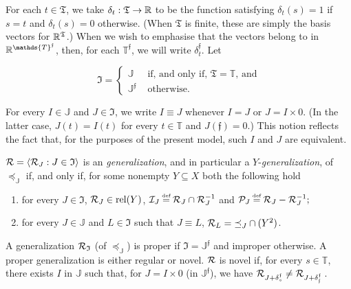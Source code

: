 \documentclass[12pt,a4paper,twoside]{article}
\newcommand{\relations}{\operatorname{rel}}
\newcommand{\novel}{\mathfrak f}
\newcommand{\preceqb}{\mathbin{\preceq}}
\newcommand{\ext}{\mathrel{\mc R}}
\newcommand{\extb}{\mathbin{\mc R}}
\newcommand{\sextb}{\mathbin{\mc P}}
\newcommand{\nextb}{\mathbin{\mc I}}
\newcommand{\mbbt}{{\mathds {T}}}
\newcommand{\mbbtp}{{\mathds{T} ^ \novel }}
\newcommand{\mbbtpp}{{\mathfrak{T}}}
\newcommand{\mbbj}{\mathds J}
\newcommand{\mbbjp}{{\mathds {J}^{\novel}}}
\newcommand{\mbbjpp}{\mathfrak I}
\begin{document}
\begin{appendices}
For each $t \in \mbbtpp$, we take  $\delta_{t} : \mbbtpp \rightarrow \R$ to be
the function satisfying $\delta_{t} ( s ) = 1$ if $s = t$ and $\delta_{t} ( s ) = 0$
otherwise. (When $\mbbtpp$ is finite, these are simply the basis vectors for $\R^{\mbbtpp}$.)  When we wish to emphasise that the  vectors belong to in
$\R^{\mbbtp}$, then, for each $\mbbtp$, we will write $\delta_{t} ^{ \novel }$.
Let
\begin{linenomath*}
\begin{equation*}
 \mbbjpp  = \left \{
\begin{array}{ll}
\mbbj & \text{ if, and only if, $\mbbtpp = \mbbt$, and}    \\
 \mbbjp & \text{ otherwise.}
\end{array}\right.
\end{equation*}
\end{linenomath*}
For every $I \in \mbbj$ and $J \in \mbbjpp$, we write $I \equiv J$ whenever
$I = J$ or $J = I\times 0$. (In the latter case, $J(t)= I(t)$ for every
$t\in \mbbt$ and $J(\novel )= 0$.) This notion reflects the fact that, for the purposes
of the present model, such $I$ and $J$ are equivalent.
\begin{definition}\label{def-{generalization}Q}
 
$\extb =\langle \extb_{J}: J \in \mbbjpp \rangle$ is an
  \emph{{generalization}}, and in particular a $Y$-\emph{{generalization}}, of
  $\preceqb _{ \mbbj }$ if, and only if, for some nonempty
  $Y \subseteq X$ both the following hold
\begin{enumerate}

\item for every $J\in \mbbjpp$, $\extb_{J}\in \relations(Y)$,
  $\nextb_{J} \defeq \extb_{J} \cap \extb_{J} ^ { -1 }$ and
  $\sextb_{J} \defeq \extb_{J} \bs \extb_{J} ^ { -1 };$

\item for every $J \in \mbbj$ and $L \in \mbbjpp$ such that $J \equiv
  L$, $\extb_{L} = \preceqb_{J} \cap (Y ^ 2)$. \label{item-preservingQ}
\end{enumerate}
A {generalization} $\ext_{\mbbjpp}$ (of $\preceq_{\mbbj}$) is proper if $\mbbjpp=
\mbbjp$ and improper otherwise.  A proper {generalization} is either regular or
novel. $\ext$ is novel if, for every $s \in \mbbt$, there exists $I$ in $\mbbj$ such that, for $J = I \times 0$ (in $\mbbjp$), we have $\extb _ { J +
  \delta _{s} ^{ \novel } } \neq \extb _ { J + \delta _ { \novel} ^{ \novel }
}$\,.
 \end{definition} 


\end{appendices}
\end{document}
